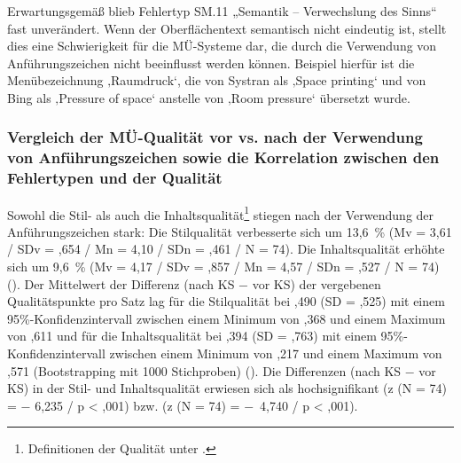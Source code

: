 Erwartungsgemäß blieb Fehlertyp SM.11 „Semantik -- Verwechslung des Sinns“ fast unverändert. Wenn der Oberflächentext semantisch nicht eindeutig ist, stellt dies eine Schwierigkeit für die MÜ-Systeme dar, die durch die Verwendung von Anführungszeichen nicht beeinflusst werden können. Beispiel hierfür ist die Menübezeichnung ‚Raumdruck‘, die von Systran als ‚Space printing‘ und von Bing als ‚Pressure of space‘ anstelle von ‚Room pressure‘ übersetzt wurde.

\subsubsection{Vergleich der MÜ-Qualität vor vs. nach der Verwendung von Anführungszeichen sowie die Korrelation zwischen den Fehlertypen und der Qualität}\label{sec:5.3.1.4}

Sowohl die Stil- als auch die Inhaltsqualität\footnote{\textrm{Definitionen der Qualität unter .}} stiegen nach der Verwendung der Anführungszeichen stark: Die Stilqualität verbesserte sich um 13,6~\% (Mv = 3,61 / SDv = ,654 / Mn = 4,10 / SDn = ,461 / N = 74). Die Inhaltsqualität erhöhte sich um 9,6~\% (Mv = 4,17 / SDv = ,857 / Mn = 4,57 / SDn = ,527 / N = 74) (). Der Mittelwert der Differenz (nach KS $-$ vor KS) der vergebenen Qualitätspunkte pro Satz lag für die Stilqualität bei ,490 (SD = ,525) mit einem 95\%\nobreakdash-Konfidenzintervall zwischen einem Minimum von ,368 und einem Maximum von ,611 und für die Inhaltsqualität bei ,394 (SD = ,763) mit einem 95\%\nobreakdash-Konfidenzintervall zwischen einem Minimum von ,217 und einem Maximum von ,571 (Bootstrapping mit 1000 Stichproben) (). Die Differenzen (nach KS $-$ vor KS) in der Stil- und Inhaltsqualität erwiesen sich als hochsignifikant (z (N = 74) = $-$ 6,235 / p < ,001) bzw. (z (N = 74) = $-$~4,740 / p < ,001).

